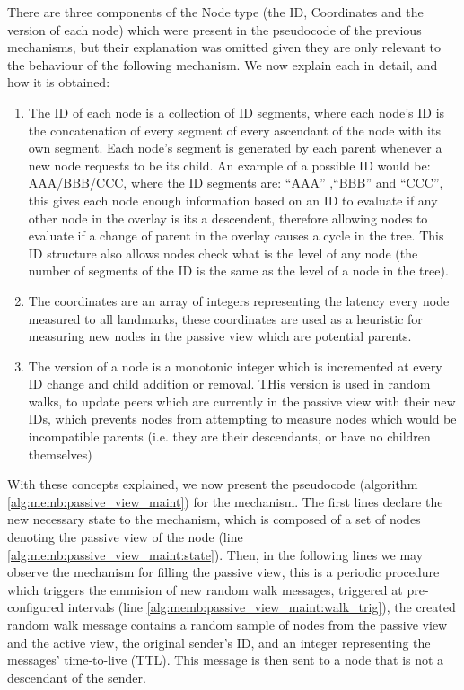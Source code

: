There are three components of the Node type (the ID, Coordinates and the version of each node) which were present in the pseudocode of the previous mechanisms, but their explanation was omitted given they are only relevant to the behaviour of the following mechanism. We now explain each in detail, and how it is obtained:

\begin{enumerate}
    \item The ID of each node is a collection of ID segments, where each node's ID is the concatenation of every segment of every ascendant of the node with its own segment. Each node's segment is generated by each parent whenever a new node requests to be its child. An example of a possible ID would be: AAA/BBB/CCC, where the ID segments are: ``AAA'' ,``BBB'' and ``CCC'', this gives each node enough information based on an ID to evaluate if any other node in the overlay is its a descendent, therefore allowing nodes to evaluate if a change of parent in the overlay causes a cycle in the tree. This ID structure also allows nodes check what is the level of any node (the number of segments of the ID is the same as the level of a node in the tree).
    
    \item The coordinates are an array of integers representing the latency every node measured to all landmarks, these coordinates are used as a heuristic for measuring new nodes in the passive view which are potential parents.
    
    \item The version of a node is a monotonic integer which is incremented at every ID change and child addition or removal. THis version is used in random walks, to update peers which are currently in the passive view with their new IDs, which prevents nodes from attempting to measure nodes which would be incompatible parents (i.e. they are their descendants, or have no children themselves)
\end{enumerate}

With these concepts explained, we now present the pseudocode (algorithm \ref{alg:memb:passive_view_maint}) for the mechanism. The first lines declare the new necessary state to the mechanism, which is composed of a set of nodes denoting the passive view of the node (line \ref{alg:memb:passive_view_maint:state}). Then, in the following lines we may observe the mechanism for filling the passive view, this is a periodic procedure which triggers the emmision of new random walk messages, triggered at pre-configured intervals (line \ref{alg:memb:passive_view_maint:walk_trig}), the created random walk message contains a random sample of nodes from the passive view and the active view, the original sender's ID, and an integer representing the messages' time-to-live (TTL). This message is then sent to a node that is not a descendant of the sender.

